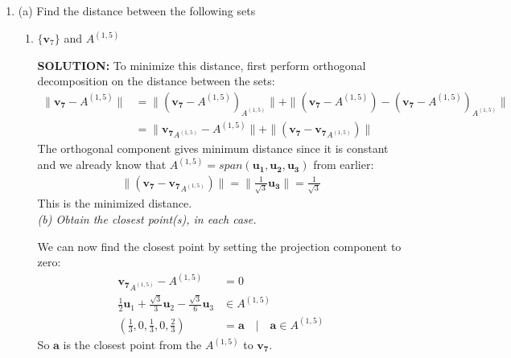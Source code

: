 \documentclass[12pt]{article}
\begin{document}
\begin{enumerate}
    \item{} (a) Find the distance between the following sets
          \begin{enumerate}
              \item[(i)] $\{\mathbf{v}_7\}$ and $A^{(1,5)}$

                    \textbf{SOLUTION:}
                    To minimize this distance, first perform orthogonal decomposition on the distance between the sets:
                    \begin{align*}
                        \| \mathbf{v_7} - A^{(1,5)} \| & = \| (\mathbf{v_7} - A^{(1,5)})_{A^{(1,5)}} \| + \| (\mathbf{v_7} - A^{(1,5)}) - (\mathbf{v_7} - A^{(1,5)})_{A^{(1,5)}} \| \\
                                                       & =  \| \mathbf{v_7}_{A^{(1,5)}} - A^{(1,5)} \| + \| (\mathbf{v_7} - \mathbf{v_7}_{A^{(1,5)}} )\|
                    \end{align*}
                    The orthogonal component gives minimum distance since it is constant and we already know that \(A^{(1,5)} = span(\mathbf{u_1, u_2, u_3})\) from earlier:
                    \begin{align*}
                        \| (\mathbf{v_7} - \mathbf{v_7}_{A^{(1,5)}} )\| = \| \tfrac{1}{\sqrt{3}}\mathbf{u_3} \| = \tfrac{1}{\sqrt{3}}
                    \end{align*}
                    This is the minimized distance. \\

                    \emph{(b) Obtain the closest point(s), in each case.}

                    We can now find the closest point by setting the projection component to zero:
                    \begin{align*}
                        \mathbf{v_7}_{A^{(1,5)}} - A^{(1,5)}                                                         & =  0                                                      \\
                        \tfrac{1}{2}\mathbf{u}_1 + \tfrac{\sqrt{3}}{3}\mathbf{u}_2 - \tfrac{\sqrt{3}}{6}\mathbf{u}_3 & \in{} A^{(1,5)}                                           \\
                        (\tfrac{1}{3}, 0, \tfrac{1}{3}, 0, \tfrac{2}{3})                                             & = \mathbf{a} \quad{} | \quad{} \mathbf{a} \in{} A^{(1,5)}
                    \end{align*}
                    So \(\mathbf{a}\) is the closest point from the $A^{(1,5)}$ to $\mathbf{v_7}$.


\end{enumerate}
\end{enumerate}
\end{document}
